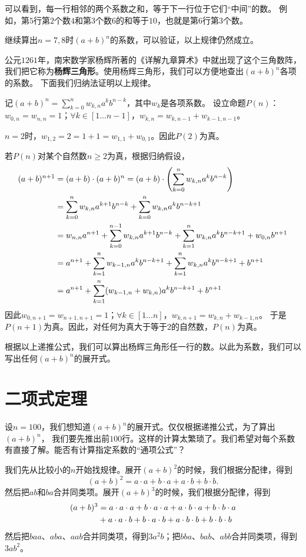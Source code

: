 \documentclass[12pt,UTF8]{ctexbook}
\begin{document}
可以看到，每一行相邻的两个系数之和，等于下一行位于它们“中间”的数。
例如，第$5$行第$2$个数$4$和第$3$个数$6$的和等于$10$，也就是第$6$行第$3$个数。

继续算出$n=7,8$时$(a+b)^n$的系数，可以验证，以上规律仍然成立。

公元$1261$年，南宋数学家杨辉所著的《详解九章算术》中就出现了这个三角数阵，
我们把它称为\textbf{杨辉三角形}。使用杨辉三角形，我们可以方便地查出$(a+b)^n$各项的系数。
下面我们归纳法证明以上规律。

记$(a+b)^n = \sum_{k=0}^n w_{k,n} a^k b^{n-k}$，其中$w_k$是各项系数。
设立命题$P(n)$：$w_{0,n}=w_{n,n}=1$；$\forall k\in[1\ldots n-1]$，$w_{k,n} = w_{k,n-1} + w_{k-1,n-1}$。

$n=2$时，$w_{1,2} = 2 = 1 + 1 = w_{1,1} + w_{0,1}$。因此$P(2)$为真。

若$P(n)$对某个自然数$n\geqslant 2$为真，根据归纳假设，
\begin{align}
 (a+b)^{n+1} &= (a+b)\cdot(a+b)^n = (a+b)\cdot\left(\sum_{k=0}^n w_{k,n} a^k b^{n-k}\right) \notag \\
  &= \sum_{k=0}^n w_{k,n} a^{k+1} b^{n-k} + \sum_{k=0}^n w_{k,n} a^k b^{n-k+1} \notag \\
  &= w_{n,n}a^{n+1} + \sum_{k=0}^{n-1} w_{k,n} a^{k+1} b^{n-k} + \sum_{k=1}^n w_{k,n} a^k b^{n-k+1} + w_{0,n}b^{n+1} \notag \\
  &= a^{n+1} + \sum_{k=1}^{n} w_{k-1,n} a^{k} b^{n-k+1} + \sum_{k=1}^n w_{k,n} a^k b^{n-k+1} + b^{n+1}\notag \\
  &= a^{n+1} + \sum_{k=1}^{n} (w_{k-1,n} + w_{k,n}) a^{k} b^{n-k+1} + b^{n+1} \notag
\end{align}
因此$w_{0,n+1}=w_{n+1,n+1}=1$；$\forall k\in[1\ldots n]$，$w_{k,n+1} = w_{k,n} + w_{k-1,n}$。
于是$P(n+1)$为真。因此，对任何为真大于等于$2$的自然数，$P(n)$为真。

根据以上递推公式，我们可以算出杨辉三角形任一行的数。以此为系数，我们可以写出任何$(a+b)^n$的展开式。

\section{二项式定理}

设$n=100$，我们想知道$(a+b)^n$的展开式。仅仅根据递推公式，为了算出$(a+b)^n$，
我们要先推出前$100$行。这样的计算太繁琐了。我们希望对每个系数有直接了解。能否有计算指定系数的“通项公式”？

我们先从比较小的$n$开始找规律。展开$(a+b)^2$的时候，我们根据分配律，得到
$$ (a+b)^2 = a\cdot a + b\cdot a + a\cdot b + b\cdot b. $$
然后把$ab$和$ba$合并同类项。展开$(a+b)^3$的时候，我们根据分配律，得到
\begin{align}
 (a+b)^3 &= a\cdot a\cdot a + b\cdot a\cdot a + a\cdot b\cdot a + b\cdot b\cdot a\notag \\
  &+ a\cdot a\cdot b + b\cdot a\cdot b + a\cdot b\cdot b + b\cdot b\cdot b \notag 
\end{align}
然后把$baa$、$aba$、$aab$合并同类项，得到$3a^2b$；把$bba$、$bab$、$abb$合并同类项，得到$3ab^2$。
\end{document}
